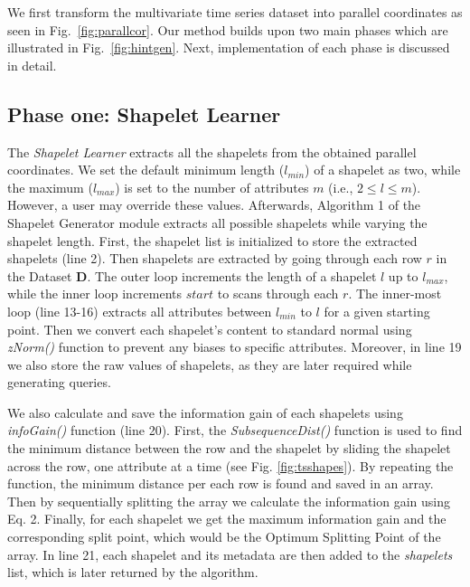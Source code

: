 \documentclass[conference]{IEEEtran}  %
\begin{document}
We first transform the multivariate time series dataset into parallel coordinates as seen in Fig.~\ref{fig:parallcor}. Our method builds upon two main phases which are illustrated in Fig.~\ref{fig:hintgen}. Next, implementation of each phase is discussed in detail.


\subsection{Phase one: Shapelet Learner}
The \textit{Shapelet Learner} extracts all the shapelets from the obtained parallel coordinates. We set the default minimum length ($l_{min}$) of a shapelet as two, while the maximum ($l_{max}$) is set to the number of attributes $m$ (i.e., $2 \leq l \leq m$). However, a user may override these values. Afterwards, Algorithm 1 of the Shapelet Generator module extracts all possible shapelets while varying the shapelet length. First, the shapelet list is initialized to store the extracted shapelets (line 2). Then shapelets are extracted by going through each row $r$ in the Dataset \textbf{D}. The outer loop increments the length of a shapelet $l$ up to $l_{max}$, while the inner loop increments $start$ to scans through each $r$. The inner-most loop (line 13-16) extracts all attributes between $l_{min}$ to $l$ for a given starting point. Then we convert each shapelet’s content to standard normal using \textit{zNorm()} function to prevent any biases to specific attributes. Moreover, in line 19 we also store the raw values of shapelets, as they are later required while generating queries. 

We also calculate and save the information gain of each shapelets using \textit{infoGain()} function (line 20). First, the \textit{SubsequenceDist()} function is used to find the minimum distance between the row and the shapelet by sliding the shapelet across the row, one attribute at a time (see Fig. \ref{fig:tsshapes}). By repeating the function, the minimum distance per each row is found and saved in an array. Then by sequentially splitting the array we calculate the information gain using Eq. 2. Finally, for each shapelet we get the maximum information gain and the corresponding split point, which would be the Optimum Splitting Point of the array. In line 21, each shapelet and its metadata are then added to the \textit{shapelets} list, which is later returned by the algorithm.
\end{document}
